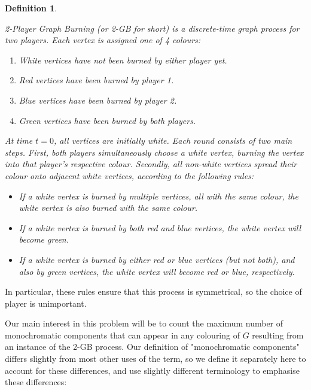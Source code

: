 \documentclass{mpaper}
\newtheorem{definition}{Definition}[section]
\begin{document}
\begin{definition}
\label{def/2-GB}

2-Player Graph Burning (or 2-GB for short) is a discrete-time graph process for two players. Each vertex is assigned one of 4 colours:

\begin{enumerate}
  \item \emph{White} vertices have not been burned by either player yet.
  \item \emph{Red} vertices have been burned by player 1.
  \item \emph{Blue} vertices have been burned by player 2.
  \item \emph{Green} vertices have been burned by \emph{both} players.
\end{enumerate}

At time $t=0$, all vertices are initially white. Each round consists of two main steps. First, both players simultaneously choose a white vertex, burning the vertex into that player's respective colour. Secondly, all non-white vertices spread their colour onto adjacent white vertices, according to the following rules:

\begin{itemize}
  \item If a white vertex is burned by multiple vertices, all with the same colour, the white vertex is also burned with the same colour.
  \item If a white vertex is burned by both red and blue vertices, the white vertex will become green.
  \item If a white vertex is burned by either red or blue vertices (but not both), and also by green vertices, the white vertex will become red or blue, respectively. 
\end{itemize}

\end{definition}

In particular, these rules ensure that this process is symmetrical, so the choice of player is unimportant.

Our main interest in this problem will be to count the maximum number of monochromatic components that can appear in any colouring of $G$ resulting from an instance of the 2-GB process. Our definition of "monochromatic components" differs slightly from most other uses of the term, so we define it separately here to account for these differences, and use slightly different terminology to emphasise these differences:
\end{document}
